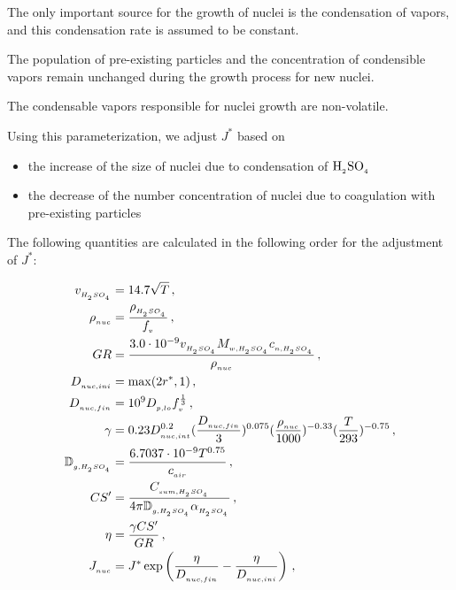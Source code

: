 \begin{assume}
  The only important source for the growth of nuclei is the condensation
  of vapors, and this condensation rate is assumed to be constant.
\end{assume}

\begin{assume}
  The population of pre-existing particles and the concentration of
  condensible vapors remain unchanged during the growth process for new
  nuclei.
\end{assume}

\begin{assume}
  The condensable vapors responsible for nuclei growth are non-volatile.
\end{assume}

Using this parameterization, we adjust $J^*$ based on

\begin{itemize}
  \item the increase of the size of nuclei due to condensation of $\rm H_{_2}SO_{_4}$
  \item the decrease of the number concentration of nuclei due to
        coagulation with pre-existing particles
\end{itemize}

The following quantities are calculated in the following order for the
adjustment of $J^*$:

\begin{align}
  v\dsub{\sag} &= 14.7 \sqrt{T} \,, \\
  \rho\dsub{nuc} &= \frac{\rho\dsub{\sag}}{f\dsub{v}} \,, \\
  GR &= \frac{3.0 \cdot 10^{-9} v\dsub{\sag} \mw{\sag} c\dsub{n,\sag}}
        {\rho\dsub{nuc}} \,, \\
  D\dsub{nuc,ini} &= \max (2r^*, 1) \,, \\
  D\dsub{nuc,fin} &= 10^9 D\dsub{p,lo} f\dsub{v}^{\frac{1}{3}} \,, \\
  \gamma &= 0.23 D\dsub{nuc,int}^{0.2}
                 (\frac{D\dsub{nuc,fin}}{3})^{0.075}
                 (\frac{\rho\dsub{nuc}}{1000})^{-0.33}
                 (\frac{T}{293})^{-0.75} \,, \labeleq{nuc:gamma} \\
  \mathbb{D}\dsub{g,\sag} &= \frac{6.7037 \cdot 10^{-9} T^{0.75}}
                             {c\dsub{air}} \,, \\
  CS^\prime &= \frac{C\dsub{sum,\sag}}
               {4 \pi \mathbb{D}\dsub{g,\sag} \alpha\dsub{\sag}} \,, \label{eq:cs_prime} \\
  \eta &= \frac{\gamma CS^\prime}{GR} \,, \\
  J\dsub{nuc} &= J^* \exp \left( \frac{\eta}{D\dsub{nuc,fin}} -
                     \frac{\eta}{D\dsub{nuc,ini}} \right) \,,
\end{align}

